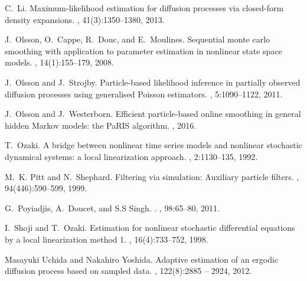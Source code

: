 \documentclass[12pt]{article}
\newcommand{\1}{\mathrm{1}}
\begin{document}
\begin{thebibliography}{10}
C.~Li.
\newblock Maximum-likelihood estimation for diffusion processes via closed-form
  density expansions.
, 41(3):1350--1380, 2013.

J.~Olsson, O.~Cappe, R.~Douc, and E.~Moulines.
\newblock Sequential monte carlo smoothing with application to parameter
  estimation in nonlinear state space models.
, 14(1):155--179, 2008.

J.~Olsson and J.~Strojby.
\newblock Particle-based likelihood inference in partially observed diffusion
  processes using generalised {P}oisson estimators.
, 5:1090--1122, 2011.

J.~Olsson and J.~Westerborn.
\newblock Efficient particle-based online smoothing in general hidden {M}arkov
  models: the {PaRIS} algorithm.
, 2016.

T.~Ozaki.
\newblock A bridge between nonlinear time series models and nonlinear
  stochastic dynamical systems: a local linearization approach.
, 2:1130--135, 1992.

M.~K. Pitt and N.~Shephard.
\newblock Filtering via simulation: Auxiliary particle filters.
, 94(446):590--599, 1999.

G.~Poyiadjis, A.~Doucet, and S.S Singh.
.
, 98:65--80, 2011.

I.~Shoji and T.~Ozaki.
\newblock Estimation for nonlinear stochastic differential equations by a local
  linearization method 1.
, 16(4):733--752, 1998.

Masayuki Uchida and Nakahiro Yoshida.
\newblock Adaptive estimation of an ergodic diffusion process based on sampled
  data.
, 122(8):2885 --
  2924, 2012.

\end{thebibliography}
\end{document}
